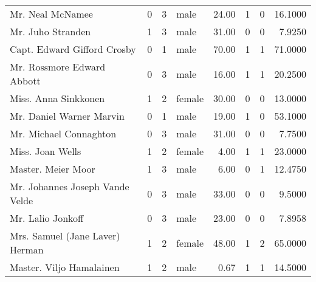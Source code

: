 \begin{tabular}{lrrlrrrr}
Mr. Neal McNamee                                   &         0 &       3 &    male &  24.00 &                        1 &                        0 &   16.1000 \\
Mr. Juho Stranden                                  &         1 &       3 &    male &  31.00 &                        0 &                        0 &    7.9250 \\
Capt. Edward Gifford Crosby                        &         0 &       1 &    male &  70.00 &                        1 &                        1 &   71.0000 \\
Mr. Rossmore Edward Abbott                         &         0 &       3 &    male &  16.00 &                        1 &                        1 &   20.2500 \\
Miss. Anna Sinkkonen                               &         1 &       2 &  female &  30.00 &                        0 &                        0 &   13.0000 \\
Mr. Daniel Warner Marvin                           &         0 &       1 &    male &  19.00 &                        1 &                        0 &   53.1000 \\
Mr. Michael Connaghton                             &         0 &       3 &    male &  31.00 &                        0 &                        0 &    7.7500 \\
Miss. Joan Wells                                   &         1 &       2 &  female &   4.00 &                        1 &                        1 &   23.0000 \\
Master. Meier Moor                                 &         1 &       3 &    male &   6.00 &                        0 &                        1 &   12.4750 \\
Mr. Johannes Joseph Vande Velde                    &         0 &       3 &    male &  33.00 &                        0 &                        0 &    9.5000 \\
Mr. Lalio Jonkoff                                  &         0 &       3 &    male &  23.00 &                        0 &                        0 &    7.8958 \\
Mrs. Samuel (Jane Laver) Herman                    &         1 &       2 &  female &  48.00 &                        1 &                        2 &   65.0000 \\
Master. Viljo Hamalainen                           &         1 &       2 &    male &   0.67 &                        1 &                        1 &   14.5000 \\

\end{tabular}
